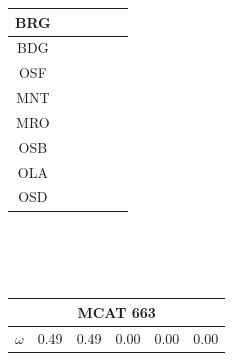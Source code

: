 \documentclass[12pt]{article}
\begin{document}
\begin{landscape}
\begin{figure}
{\begin{minipage}[c]{0.3\textwidth}
\begin{tabular}{|c|c|c|c|c|c|}
        BRG&\cellcolor[HTML]{377EB8}&\cellcolor[HTML]{E41A1C}&\cellcolor[HTML]{E41A1C}&\cellcolor[HTML]{377EB8}&\cellcolor[HTML]{377EB8}\\ \hline %
        BDG&\cellcolor[HTML]{377EB8}&\cellcolor[HTML]{377EB8}&\cellcolor[HTML]{377EB8}&\cellcolor[HTML]{377EB8}&\cellcolor[HTML]{377EB8}\\ \hline %
        OSF&\cellcolor[HTML]{4DAF4A}&\cellcolor[HTML]{377EB8}&\cellcolor[HTML]{377EB8}&\cellcolor[HTML]{4DAF4A}&\cellcolor[HTML]{377EB8}\\ \hline %
        MNT&\cellcolor[HTML]{4DAF4A}&\cellcolor[HTML]{377EB8}&\cellcolor[HTML]{377EB8}&\cellcolor[HTML]{4DAF4A}&\cellcolor[HTML]{4DAF4A}\\ \hline %
        MRO&\cellcolor[HTML]{4DAF4A}&\cellcolor[HTML]{4DAF4A}&\cellcolor[HTML]{4DAF4A}&\cellcolor[HTML]{4DAF4A}&\cellcolor[HTML]{4DAF4A}\\ \hline %
        OSB&\cellcolor[HTML]{984EA3}&\cellcolor[HTML]{984EA3}&\cellcolor[HTML]{984EA3}&\cellcolor[HTML]{984EA3}&\cellcolor[HTML]{4DAF4A}\\ \hline %
        OLA&\cellcolor[HTML]{984EA3}&\cellcolor[HTML]{984EA3}&\cellcolor[HTML]{FF7F00}&\cellcolor[HTML]{FF7F00}&\cellcolor[HTML]{984EA3}\\ \hline %
        OSD&\cellcolor[HTML]{984EA3}&\cellcolor[HTML]{984EA3}&\cellcolor[HTML]{FF7F00}&\cellcolor[HTML]{FF7F00}&\cellcolor[HTML]{984EA3}\\ \hline %
\end{tabular}\\$~$\\$~$\\
\hspace*{-2.5cm}
\begin{tabular}{|c|c|c|c|c|c|}%
         \hline \multicolumn{6}{|c|}{MCAT 663} \\ \hline
         $\omega$&0.49&0.49&0.00&0.00&0.00\\ \hline %

\end{tabular}
\end{minipage}}
\end{figure}
\end{landscape}
\end{document}
